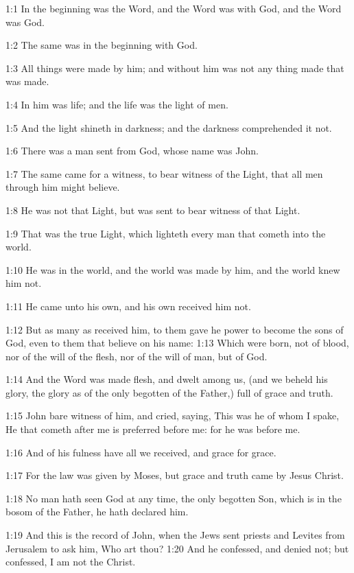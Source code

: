 

1:1 In the beginning was the Word, and the Word was with God, and the
Word was God.

1:2 The same was in the beginning with God.

1:3 All things were made by him; and without him was not any thing
made that was made.

1:4 In him was life; and the life was the light of men.

1:5 And the light shineth in darkness; and the darkness comprehended
it not.

1:6 There was a man sent from God, whose name was John.

1:7 The same came for a witness, to bear witness of the Light, that
all men through him might believe.

1:8 He was not that Light, but was sent to bear witness of that Light.

1:9 That was the true Light, which lighteth every man that cometh into
the world.

1:10 He was in the world, and the world was made by him, and the world
knew him not.

1:11 He came unto his own, and his own received him not.

1:12 But as many as received him, to them gave he power to become the
sons of God, even to them that believe on his name: 1:13 Which were
born, not of blood, nor of the will of the flesh, nor of the will of
man, but of God.

1:14 And the Word was made flesh, and dwelt among us, (and we beheld
his glory, the glory as of the only begotten of the Father,) full of
grace and truth.

1:15 John bare witness of him, and cried, saying, This was he of whom
I spake, He that cometh after me is preferred before me: for he was
before me.

1:16 And of his fulness have all we received, and grace for grace.

1:17 For the law was given by Moses, but grace and truth came by Jesus
Christ.

1:18 No man hath seen God at any time, the only begotten Son, which is
in the bosom of the Father, he hath declared him.

1:19 And this is the record of John, when the Jews sent priests and
Levites from Jerusalem to ask him, Who art thou?  1:20 And he
confessed, and denied not; but confessed, I am not the Christ.

